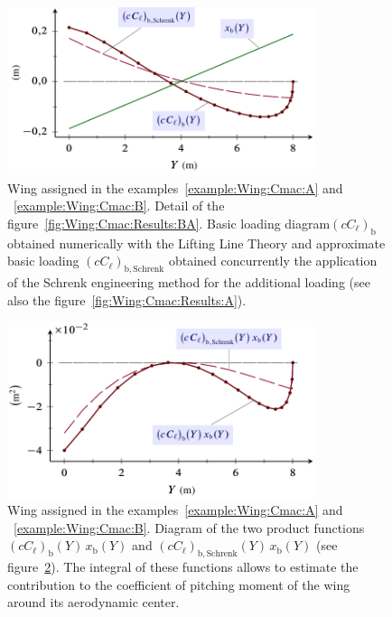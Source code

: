 \documentclass[[12pt,twoside]{book}
\begin{document}
\begin{figure}[t]%
    \includegraphics[width=0.80\textwidth]{Chapter_2/pitching_moment_two/wing_Cmac_2_loading_drawing_2.pdf}%
  \caption{
           Wing assigned in the examples~\ref{example:Wing:Cmac:A} and ~\ref{example:Wing:Cmac:B}.
           Detail of the figure~\ref{fig:Wing:Cmac:Results:BA}.
           Basic loading diagram$(cC_\ell)_\mathrm{b}$ obtained numerically
            with the Lifting Line Theory
         and approximate basic loading $(cC_\ell)_\mathrm{b,Schrenk}$ obtained concurrently
            the application of the Schrenk engineering method for the additional loading
           (see also the figure~\ref{fig:Wing:Cmac:Results:A}).}
  \label{fig:Wing:Cmac:Results:BB}%
\end{figure}
\begin{figure}
  [t]%
    \includegraphics[width=0.80\textwidth]{Chapter_2/pitching_moment_two/wing_Cmac_2_loading_drawing_3.pdf}%
  \caption{
         Wing assigned in the examples~\ref{example:Wing:Cmac:A} and ~\ref{example:Wing:Cmac:B}.
          Diagram of the two product functions $(cC_\ell)_\mathrm{b}(Y)\,x_\mathrm{b}(Y)$ 
          and $(cC_\ell)_\mathrm{b,Schrenk}(Y)\,x_\mathrm{b}(Y)$
           (see figure~\ref{fig:Wing:Cmac:Results:BC}).
           The integral of these functions allows to estimate the contribution
            to the coefficient
            of pitching moment 
      of the wing around its aerodynamic center.
  }
  \label{fig:Wing:Cmac:Results:BC}%
\end{figure}%
\end{document}
